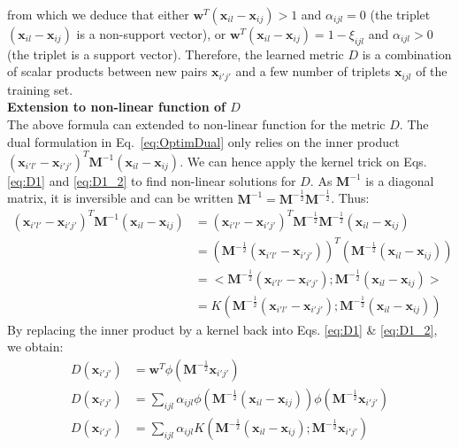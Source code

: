 \noindent from which we deduce that either $\textbf{w}^T(\textbf{x}_{il}-\textbf{x}_{ij}) > 1 $ and $\alpha_{ijl} = 0$ (the triplet $(\textbf{x}_{il}-\textbf{x}_{ij})$ is a non-support vector), or $\textbf{w}^T(\textbf{x}_{il}-\textbf{x}_{ij}) = 1- \xi_{ijl}$ and $\alpha_{ijl} > 0$ (the triplet is a support vector). Therefore, the learned metric $D$ is a combination of scalar products between new pairs $\textbf{x}_{i'j'}$ and a few number of triplets $\textbf{x}_{ijl}$ of the training set. \\


\noindent \textbf{Extension to non-linear function of $D$} \\
\noindent The above formula can extended to non-linear function for the metric $D$. The dual formulation in Eq.~\ref{eq:OptimDual} only relies on the inner product $(\textbf{x}_{i'l'}-\textbf{x}_{i'j'})^T \textbf{M}^{-1} (\textbf{x}_{il}-\textbf{x}_{ij})$. We can hence apply the kernel trick on Eqs. \ref{eq:D1} and \ref{eq:D1_2} to find non-linear solutions for $D$. As $\textbf{M}^{-1}$ is a diagonal matrix, it is inversible and can be written $\textbf{M}^{-1} = \textbf{M}^{-\frac{1}{2}} \textbf{M}^{-\frac{1}{2}}$. Thus:
\begin{align}
		(\textbf{x}_{i'l'}-\textbf{x}_{i'j'})^T \textbf{M}^{-1} (\textbf{x}_{il}-\textbf{x}_{ij}) 
		& = (\textbf{x}_{i'l'}-\textbf{x}_{i'j'})^T \textbf{M}^{-\frac{1}{2}} \textbf{M}^{-\frac{1}{2}} (\textbf{x}_{il}-\textbf{x}_{ij})	\nonumber	\\
		& = \left( \textbf{M}^{-\frac{1}{2}} (\textbf{x}_{i'l'}-\textbf{x}_{i'j'}) \right)^T \left( \textbf{M}^{-\frac{1}{2}} (\textbf{x}_{il}-\textbf{x}_{ij}) \right) \nonumber \\
		& = <\textbf{M}^{-\frac{1}{2}} (\textbf{x}_{i'l'}-\textbf{x}_{i'j'}) ; \textbf{M}^{-\frac{1}{2}} (\textbf{x}_{il}-\textbf{x}_{ij}) > \nonumber \\
		& = K(\textbf{M}^{-\frac{1}{2}} (\textbf{x}_{i'l'}-\textbf{x}_{i'j'}) ;  \textbf{M}^{-\frac{1}{2}} (\textbf{x}_{il}-\textbf{x}_{ij}) ) \nonumber
\end{align}
\noindent By replacing the inner product by a kernel back into Eqs. \ref{eq:D1} \& \ref{eq:D1_2}, we obtain:
\begin{align}
D(\textbf{x}_{i'j'}) & = \textbf{w}^T \phi(\textbf{M}^{-\frac{1}{2}}\textbf{x}_{i'j'}) \nonumber\\
D(\textbf{x}_{i'j'}) &= \sum\limits_{ijl} \alpha_{ijl} 
\phi( \textbf{M}^{-\frac{1}{2}}
(\textbf{x}_{il}-\textbf{x}_{ij})
)
\phi(	
\textbf{M}^{-\frac{1}{2}} \textbf{x}_{i'j'}
) \nonumber \\
D(\textbf{x}_{i'j'}) &= \sum\limits_{ijl} \alpha_{ijl} 
K(\textbf{M}^{-\frac{1}{2}} (\textbf{x}_{il}-\textbf{x}_{ij}) ; \textbf{M}^{-\frac{1}{2}}\textbf{x}_{i'j'}) \nonumber				
\end{align}
